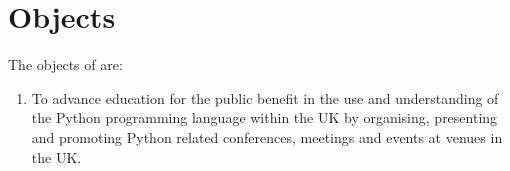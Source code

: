 \section{Objects}\label{sec:objects}
The objects of \shortname{} are:
\begin{enumerate}
    \item To advance education for the public benefit in the use and understanding of the Python programming language within the UK by organising, presenting and promoting Python related conferences, meetings and events at venues in the UK.
\end{enumerate}
